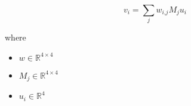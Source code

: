 \documentclass[12pt]{article}
\begin{document}
\[
\textit{v}_{ \textit{i} } = \sum_\textit{j} \textit{w}_{\textit{i}, \textit{j}}\textit{M}_{ \textit{j} }\textit{u}_{ \textit{i} }
\]

where
\begin{itemize}
\item $\textit{w} \in \mathbb{R}^{ 4 \times 4 }$
\item $\textit{M}_{\textit{j}} \in \mathbb{R}^{ 4 \times 4 }$
\item $\textit{u}_{\textit{i}} \in \mathbb{R}^{ 4}$
\end{itemize}
\end{document}
